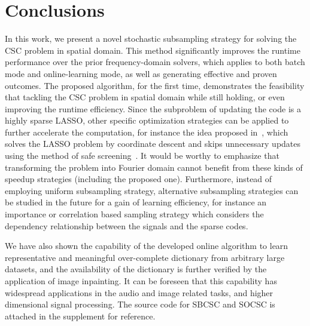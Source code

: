 \section{Conclusions}
In this work, we present a novel stochastic subsampling strategy for solving the CSC problem in spatial domain. This method significantly improves the runtime performance over the prior frequency-domain solvers, which applies to both batch mode and online-learning mode, as well as generating effective and proven outcomes. The proposed algorithm, for the first time, demonstrates the feasibility that tackling the CSC problem in spatial domain while still holding, or even improving the runtime efficiency. Since the subproblem of updating the code is a highly sparse LASSO, other specific optimization strategies can be applied to further accelerate the computation, for instance the idea proposed in~\cite{johnson2017stingycd}, which solves the LASSO problem by coordinate descent and skips unnecessary updates using the method of safe screening~\cite{ghaoui2012Swfe}. It would be worthy to emphasize that transforming the problem into Fourier domain cannot benefit from these kinds of speedup strategies (including the proposed one). Furthermore, instead of employing uniform subsampling strategy, alternative subsampling strategies can be studied in the future for a gain of learning efficiency, for instance an importance or correlation based sampling strategy which considers the dependency relationship between the signals and the sparse codes.

We have also shown the capability of the developed online algorithm to learn representative and meaningful over-complete dictionary from arbitrary large datasets, and the availability of the dictionary is further verified by the application of image inpainting. It can be foreseen that this capability has widespread applications in the audio and image related tasks, and higher dimensional signal processing. The source code for SBCSC and SOCSC is attached in the supplement for reference. 